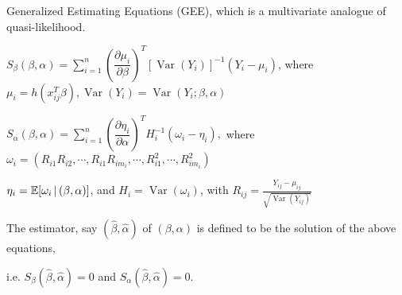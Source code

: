\documentclass[UTF8,a4paper,10pt]{article}
\begin{document}
\pagebreak

Generalized Estimating Equations (GEE), which is a multivariate analogue of
quasi-likelihood.


$S_{\beta}(\beta, \alpha)=\sum_{i=1}^{n}\left(\dfrac{\partial \mu_{i}}{\partial \beta}\right)^{T}\left[\operatorname{Var}\left(Y_{i}\right)\right]^{-1}\left(Y_{i}-\mu_{i}\right)$, where $\mu_{i}=h\left(x_{i j}^{T} \beta\right), \operatorname{Var}\left(Y_{i}\right)=\operatorname{Var}\left(Y_{i} ; \beta, \alpha\right)$

$S_{\alpha}(\beta, \alpha)=\sum_{i=1}^{n}\left(\dfrac{\partial \eta_{i}}{\partial \alpha}\right)^{T} H_{i}^{-1}\left(\omega_{i}-\eta_{i}\right),$ where $\omega_{i}=\left(R_{i 1} R_{i 2}, \cdots, R_{i 1} R_{i m_{i}}, \cdots, R_{i 1}^{2}, \cdots, R_{i m_{i}}^{2}\right)$

\(\eta_i = \operatorname{\mathbb{E}}[\omega_i\,|\,(\beta,\alpha)]\), and \(H_i = \operatorname{Var}(\omega_i)\), with \(R_{ij} = \frac{Y_{ij} - \mu_{ij}}{\sqrt{\operatorname{Var}(Y_{ij})}}\)

The estimator, say $(\hat{\beta}, \hat{\alpha})$ of $(\beta, \alpha)$ is defined to be the solution of the above equations,

i.e. $S_{\beta}(\hat{\beta}, \hat{\alpha})=0$ and $S_{\alpha}(\hat{\beta}, \hat{\alpha})=0$.
\end{document}
